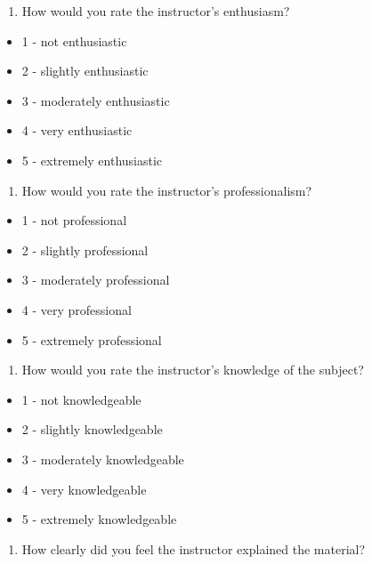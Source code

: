 \documentclass[
]{article}
\providecommand{\tightlist}{%
  \setlength{\itemsep}{0pt}\setlength{\parskip}{0pt}}
\begin{document}
\begin{enumerate}
\def\labelenumi{\arabic{enumi}.}
\tightlist
\item
  How would you rate the instructor's enthusiasm?
\end{enumerate}

\begin{itemize}
\tightlist
\item
  1 - not enthusiastic
\item
  2 - slightly enthusiastic
\item
  3 - moderately enthusiastic
\item
  4 - very enthusiastic
\item
  5 - extremely enthusiastic
\end{itemize}

\begin{enumerate}
\def\labelenumi{\arabic{enumi}.}
\setcounter{enumi}{1}
\tightlist
\item
  How would you rate the instructor's professionalism?
\end{enumerate}

\begin{itemize}
\tightlist
\item
  1 - not professional
\item
  2 - slightly professional
\item
  3 - moderately professional
\item
  4 - very professional
\item
  5 - extremely professional
\end{itemize}

\begin{enumerate}
\def\labelenumi{\arabic{enumi}.}
\setcounter{enumi}{2}
\tightlist
\item
  How would you rate the instructor's knowledge of the subject?
\end{enumerate}

\begin{itemize}
\tightlist
\item
  1 - not knowledgeable
\item
  2 - slightly knowledgeable
\item
  3 - moderately knowledgeable
\item
  4 - very knowledgeable
\item
  5 - extremely knowledgeable
\end{itemize}

\begin{enumerate}
\def\labelenumi{\arabic{enumi}.}
\setcounter{enumi}{3}
\tightlist
\item
  How clearly did you feel the instructor explained the material?
\end{enumerate}
\end{document}
